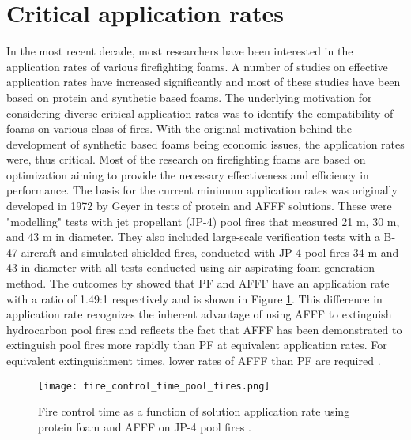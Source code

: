 \section{Critical application rates}
In the most recent decade, most researchers have been interested in the application rates of various firefighting foams. A number of studies on effective application rates have increased significantly and most of these studies have been based on protein and synthetic based foams. The underlying motivation for considering diverse critical application rates was to identify the compatibility of foams on various class of fires. With the original motivation behind the development of synthetic based foams being economic issues, the application rates were, thus critical.
Most of the research on firefighting foams are based on optimization aiming to provide the necessary effectiveness and efficiency in performance. The basis for the current minimum application rates was originally developed in 1972 by Geyer \cite{geyer1972evaluation} in tests of protein and AFFF solutions. These were "modelling" tests with jet propellant (JP-4) pool fires that measured 21 m, 30 m, and 43 m in diameter. They also included large-scale verification tests with a B-47 aircraft and simulated shielded fires, conducted with JP-4 pool fires 34 m and 43 in diameter with all tests conducted using air-aspirating foam generation method. The outcomes by \cite{geyer1972evaluation} showed that PF and AFFF have an application rate with a ratio of 1.49:1 respectively and is shown in Figure \ref{ch2:figure:pool}. This difference in application rate recognizes the inherent advantage of using AFFF to extinguish hydrocarbon pool fires and reflects the fact that AFFF has been demonstrated to extinguish pool fires more rapidly than PF at equivalent application rates. For equivalent extinguishment times, lower rates of AFFF than PF are required \cite{scheffey1995evaluating}.

\begin{figure}[H]
    \centering
    \texttt{[image: fire\_control\_time\_pool\_fires.png]}
    \caption{Fire control time as a function of solution application rate using protein foam and AFFF on JP-4 pool fires \cite{geyer1972evaluation}.}
    \label{ch2:figure:pool}
\end{figure}

